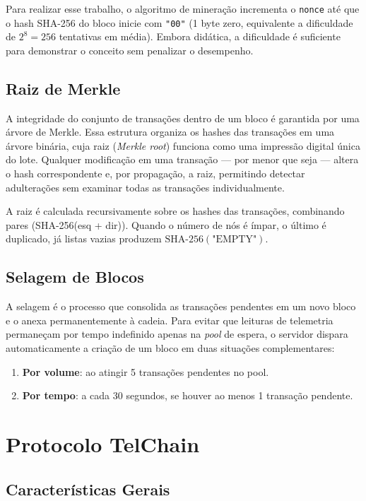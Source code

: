 \documentclass[12pt, a4paper]{article}
\begin{document}
Para realizar esse trabalho, o algoritmo de mineração incrementa o \texttt{nonce} até que o hash SHA-256 do bloco
inicie com \texttt{"00"} (1 byte zero, equivalente a dificuldade de $2^8 = 256$ tentativas
em média). Embora didática, a dificuldade é suficiente para demonstrar o conceito sem
penalizar o desempenho.

\subsection{Raiz de Merkle}

A integridade do conjunto de transações dentro de um bloco é garantida por uma
árvore de Merkle. Essa estrutura organiza os hashes das transações em uma árvore
binária, cuja raiz (\textit{Merkle root}) funciona como uma impressão digital única
do lote. Qualquer modificação em uma transação — por menor que seja — altera o
hash correspondente e, por propagação, a raiz, permitindo detectar adulterações
sem examinar todas as transações individualmente.

A raiz é calculada recursivamente sobre os hashes das transações, combinando pares
(SHA-256(esq + dir)). Quando o número de nós é ímpar, o último é duplicado, já listas
vazias produzem \(\mathrm{SHA\text{-}256}(\text{"EMPTY"})\).

\subsection{Selagem de Blocos}
A selagem é o processo que consolida as transações pendentes em um novo bloco
e o anexa permanentemente à cadeia. Para evitar que leituras de telemetria
permaneçam por tempo indefinido apenas na \emph{pool} de espera, o servidor
dispara automaticamente a criação de um bloco em duas situações complementares:
\begin{enumerate}[nosep]
  \item \textbf{Por volume}: ao atingir 5 transações pendentes no pool.
  \item \textbf{Por tempo}: a cada 30 segundos, se houver ao menos 1 transação pendente.
\end{enumerate}


\section{Protocolo TelChain}

\subsection{Características Gerais}
\end{document}
